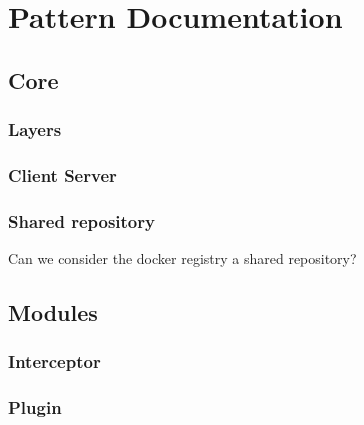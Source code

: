 
\clearpage
\chapter{Pattern Documentation}
\label{ch:patterns}


\section{Core}
\subsection{Layers}

\subsection{Client Server}

\subsection{Shared repository}
Can we consider the docker registry a shared repository?




\section{Modules}
\subsection{Interceptor}
\subsection{Plugin}

